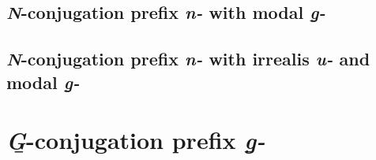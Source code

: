 \documentclass[12pt,letterpaper,landscape,oneside,article]{memoir}
\begin{document}
\subsection{\textit{N}-conjugation prefix \textit{n-} with modal \textit{g̱-}}

\subsection{\textit{N}-conjugation prefix \textit{n-} with irrealis \textit{u-} and modal \textit{g̱-}}

\clearpage
\section{\textit{G̱}-conjugation prefix \textit{g̱-}}
\end{document}
